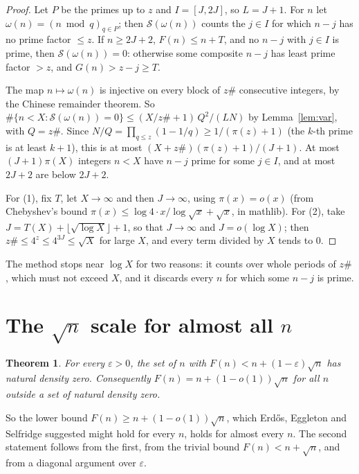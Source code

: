 \documentclass[11pt,letterpaper]{article}
\newtheorem{theorem}{Theorem}
\theoremstyle{remark}
\newcommand{\cS}{\mathcal S}
\begin{document}
\begin{proof}
Let $P$ be the primes up to $z$ and $I=[J,2J]$, so $L=J+1$. For $n$ let
$\omega(n)=(n\bmod q)_{q\in P}$; then $\cS(\omega(n))$ counts the $j\in I$ for
which $n-j$ has no prime factor $\le z$. If $n\ge 2J+2$, $F(n)\le n+T$, and no
$n-j$ with $j\in I$ is prime, then $\cS(\omega(n))=0$: otherwise some
composite $n-j$ has least prime factor $>z$, and $G(n)>z-j\ge T$.

The map $n\mapsto\omega(n)$ is injective on every block of $z\#$ consecutive
integers, by the Chinese remainder theorem. So
$\#\{n<X:\cS(\omega(n))=0\}\le (X/z\#+1)\,Q^2/(LN)$ by Lemma~\ref{lem:var},
with $Q=z\#$. Since $N/Q=\prod_{q\le z}(1-1/q)\ge 1/(\pi(z)+1)$ (the $k$-th
prime is at least $k+1$), this is at most $(X+z\#)(\pi(z)+1)/(J+1)$. At most
$(J+1)\pi(X)$ integers $n<X$ have $n-j$ prime for some $j\in I$, and at most
$2J+2$ are below $2J+2$.

For (1), fix $T$, let $X\to\infty$ and then $J\to\infty$, using
$\pi(x)=o(x)$ (from Chebyshev's bound
$\pi(x)\le \log 4\cdot x/\log\sqrt x+\sqrt x$, in mathlib). For (2), take
$J=T(X)+\lfloor\sqrt{\log X}\rfloor+1$, so that $J\to\infty$ and $J=o(\log X)$;
then $z\#\le 4^{z}\le 4^{3J}\le\sqrt X$ for large $X$, and every term divided by
$X$ tends to $0$.
\end{proof}

The method stops near $\log X$ for two reasons: it counts over whole periods of
$z\#$, which must not exceed $X$, and it discards every $n$ for which some
$n-j$ is prime.

\section{\texorpdfstring{The $\sqrt n$ scale for almost all $n$}{The sqrt n scale for almost all n}}\label{sec:sqrt}

\begin{theorem}\label{thm:sqrt}
For every $\varepsilon>0$, the set of $n$ with $F(n)<n+(1-\varepsilon)\sqrt n$
has natural density zero. Consequently $F(n)=n+(1-o(1))\sqrt n$ for all $n$
outside a set of natural density zero.
\end{theorem}

So the lower bound $F(n)\ge n+(1-o(1))\sqrt n$, which Erd\H{o}s, Eggleton and
Selfridge suggested might hold for every $n$, holds for almost every $n$. The
second statement follows from the first, from the trivial bound
$F(n)<n+\sqrt n$, and from a diagonal argument over $\varepsilon$.
\end{document}
